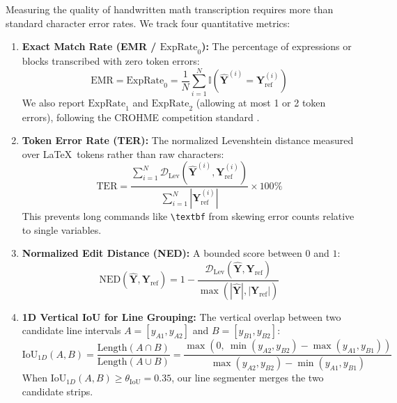 Measuring the quality of handwritten math transcription requires more than standard character error rates. We track four quantitative metrics:
\begin{enumerate}
    \item \textbf{Exact Match Rate (EMR / $\text{ExpRate}_0$):} The percentage of expressions or blocks transcribed with zero token errors:
    \begin{equation}
    \text{EMR} = \text{ExpRate}_0 = \frac{1}{N} \sum_{i=1}^N \mathbb{I}\left( \hat{\mathbf{Y}}^{(i)} = \mathbf{Y}_{\text{ref}}^{(i)} \right)
    \end{equation}
    We also report $\text{ExpRate}_1$ and $\text{ExpRate}_2$ (allowing at most 1 or 2 token errors), following the CROHME competition standard \cite{mouchere2016icfhr}.
    \item \textbf{Token Error Rate (TER):} The normalized Levenshtein distance measured over \LaTeX\ tokens rather than raw characters:
    \begin{equation}
    \text{TER} = \frac{\sum_{i=1}^N \mathcal{D}_{\text{Lev}}\left( \hat{\mathbf{Y}}^{(i)}, \mathbf{Y}_{\text{ref}}^{(i)} \right)}{\sum_{i=1}^N |\mathbf{Y}_{\text{ref}}^{(i)}|} \times 100\%
    \end{equation}
    This prevents long commands like \texttt{\textbackslash textbf} from skewing error counts relative to single variables.
    \item \textbf{Normalized Edit Distance (NED):} A bounded score between $0$ and $1$:
    \begin{equation}
    \text{NED}\left( \hat{\mathbf{Y}}, \mathbf{Y}_{\text{ref}} \right) = 1 - \frac{\mathcal{D}_{\text{Lev}}\left( \hat{\mathbf{Y}}, \mathbf{Y}_{\text{ref}} \right)}{\max\left( |\hat{\mathbf{Y}}|, |\mathbf{Y}_{\text{ref}}| \right)}
    \end{equation}
    \item \textbf{1D Vertical IoU for Line Grouping:} The vertical overlap between two candidate line intervals $A = [y_{A1}, y_{A2}]$ and $B = [y_{B1}, y_{B2}]$:
    \begin{equation}
    \text{IoU}_{1D}(A, B) = \frac{\text{Length}(A \cap B)}{\text{Length}(A \cup B)} = \frac{\max\left(0, \ \min(y_{A2}, y_{B2}) - \max(y_{A1}, y_{B1})\right)}{\max(y_{A2}, y_{B2}) - \min(y_{A1}, y_{B1})}
    \end{equation}
    When $\text{IoU}_{1D}(A, B) \ge \theta_{\text{IoU}} = 0.35$, our line segmenter merges the two candidate strips.
\end{enumerate}

